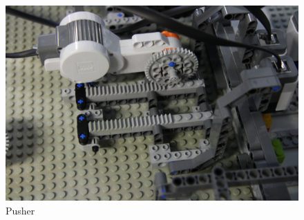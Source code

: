 \documentclass[%
  a4paper,%
  11pt,%
  blue,%
  hyperref	%
  ]{tubsartcl}
\begin{document}
\begin{figure}[!htb]
\begin{center}
\includegraphics[scale=0.3]{graphics/pusher.jpg}
\end{center}
\caption{Pusher}
\end{figure}

\makebackpage[trisec]%
\end{document}
